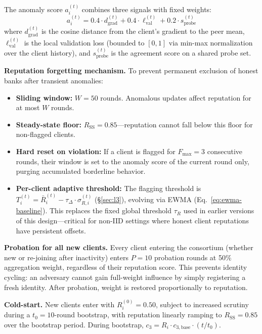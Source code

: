 \documentclass[10pt,journal]{IEEEtran}
\begin{document}
The anomaly score $a_i^{(t)}$ combines three signals with fixed weights:
\begin{equation}
a_i^{(t)} = 0.4 \cdot d_{\text{grad}}^{(t)} + 0.4 \cdot \ell_{\text{val}}^{(t)} + 0.2 \cdot s_{\text{probe}}^{(t)}
\label{eq:anomaly-weight}
\end{equation}
where $d_{\text{grad}}^{(t)}$ is the cosine distance from the client's gradient to the peer mean, $\ell_{\text{val}}^{(t)}$ is the local validation loss (bounded to $[0,1]$ via min-max normalization over the client history), and $s_{\text{probe}}^{(t)}$ is the agreement score on a shared probe set.

\textbf{Reputation forgetting mechanism.} To prevent permanent exclusion of honest banks after transient anomalies:
\begin{itemize}
  \item \textbf{Sliding window:} $W=50$ rounds. Anomalous updates affect reputation for at most $W$ rounds.
  \item \textbf{Steady-state floor:} $R_{\text{SS}} = 0.85$---reputation cannot fall below this floor for non-flagged clients.
  \item \textbf{Hard reset on violation:} If a client is flagged for $F_{\text{max}} = 3$ consecutive rounds, their window is set to the anomaly score of the current round only, purging accumulated borderline behavior.
  \item \textbf{Per-client adaptive threshold:} The flagging threshold is $T_i^{(t)} = \bar{R}_i^{(t)} - \tau_\Delta \cdot \sigma_{R,i}^{(t)}$ (\S\ref{sec:l3}), evolving via EWMA (Eq.~\ref{eq:ewma-baseline}). This replaces the fixed global threshold $\tau_R$ used in earlier versions of this design---critical for non-IID settings where honest client reputations have persistent offsets.
\end{itemize}

\textbf{Probation for all new clients.} Every client entering the consortium (whether new or re-joining after inactivity) enters $P=10$ probation rounds at 50\% aggregation weight, regardless of their reputation score. This prevents identity cycling: an adversary cannot gain full-weight influence by simply registering a fresh identity. After probation, weight is restored proportionally to reputation.

\textbf{Cold-start.} New clients enter with $R_i^{(0)} = 0.50$, subject to increased scrutiny during a $t_0 = 10$-round bootstrap, with reputation linearly ramping to $R_{\text{SS}} = 0.85$ over the bootstrap period. During bootstrap, $c_3 = R_i \cdot c_{3,\text{base}} \cdot (t/t_0)$.
\end{document}
